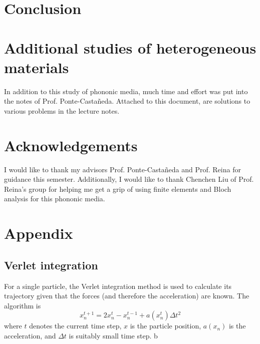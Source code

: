 \documentclass{article}
\begin{document}
\section{Conclusion}

\section{Additional studies of heterogeneous materials}
In addition to this study of phononic media, much time and effort was put into 
the notes of Prof. Ponte-Casta\~neda. Attached to this document, are solutions 
to various problems in the lecture notes. 

\section{Acknowledgements}
I would like to thank my advisors Prof. Ponte-Casta\~neda and Prof. Reina for
guidance this semester. Additionally, I would like to thank Chenchen Liu of
Prof. Reina's group for helping me get a grip of using finite elements and Bloch
analysis for this phononic media.

\appendix
\section{Appendix}
\subsection{Verlet integration} \label{verlet}
For a single particle, the Verlet integration method is used to calculate its 
trajectory given that the forces (and therefore the acceleration) are known. 
The algorithm is
\begin{equation}
x^{t+1}_{n} = 2x^{t}_{n} - x^{t-1}_{n} + a(x^{t}_n)\Delta t^2
\end{equation}
where $t$ denotes the current time step, $x$ is the particle position, $a(x_n)$ 
is the acceleration, and $\Delta t$ is suitably small time step. b
\end{document}
